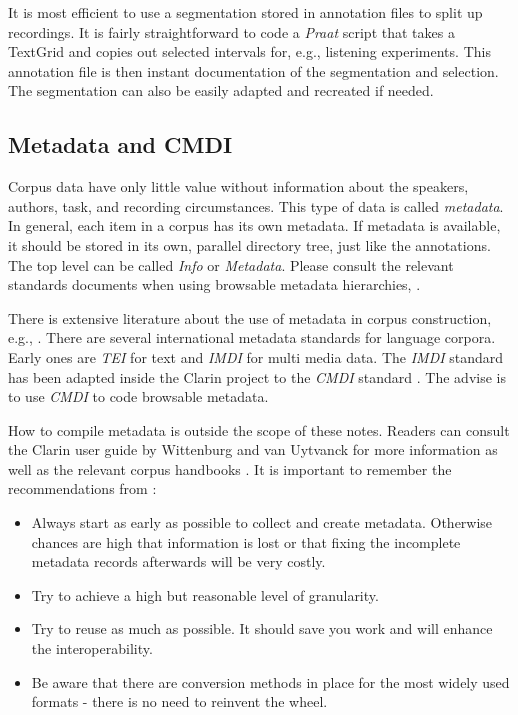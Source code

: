 \documentclass[10pt, a4paper]{article}
\begin{document}
It is most efficient to use a segmentation stored in annotation files to split up recordings. It is fairly straightforward to code a \emph{Praat} script that takes a TextGrid and copies out selected intervals for, e.g., listening experiments. This annotation file is then instant documentation of the segmentation and selection. The segmentation can also be easily adapted and recreated if needed.

\subsection{Metadata and CMDI}

Corpus data have only little value without information about the speakers, authors, task, and recording circumstances. This type of data is called \emph{metadata}. In general, each item in a corpus has its own metadata. If metadata is available, it should be stored in its own, parallel directory tree, just like the annotations. The top level can be called \emph{Info} or \emph{Metadata}. Please consult the relevant standards documents when using browsable metadata hierarchies, \cite{IMDI,CMDI}.

There is extensive literature about the use of metadata in corpus construction, e.g., \cite{WittenburgMetadata,burnard2005metadata,duval2002metadata,hughes2005metadata,broeder2010data}. There are several international metadata standards for language corpora. Early ones are \emph{TEI} \cite{TEI} for text and \emph{IMDI} \cite{IMDI} for multi media data. The \emph{IMDI} standard has been adapted inside the Clarin project \cite{CLARINERIC} to the \emph{CMDI} standard \cite{CMDI,WittenburgCMDI}. The advise is to use \emph{CMDI} to code browsable metadata.

How to compile metadata is outside the scope of these notes. Readers can consult the Clarin user guide by Wittenburg and van Uytvanck \cite{WittenburgMetadata} for more information as well as the relevant corpus handbooks \cite{wynne2005developing,gibbon1997handbook,gibbon2000handbook}. It is important to remember the recommendations from \cite{WittenburgMetadata}:
\begin{itemize}
\item Always start as early as possible to collect and create metadata. Otherwise chances are high that information is lost or that fixing the incomplete metadata records afterwards will be very costly.
\item Try to achieve a high but reasonable level of granularity.
\item Try to reuse as much as possible. It should save you work and will enhance the interoperability.
\item Be aware that there are conversion methods in place for the most widely used formats - there is no need to reinvent the wheel.
\end{itemize}
\end{document}
